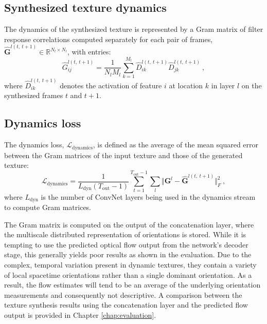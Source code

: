\subsection{Synthesized texture dynamics}

The dynamics of the synthesized texture is represented
by a Gram matrix of filter response correlations 
computed separately for each pair of frames,
$\hat{\mathbf{G}}^{l(t,\ t+1)} \in \mathbb{R}^{N_l \times N_l}$,
with entries:
\begin{equation}
	\hat{G}_{ij}^{l(t,\ t+1)} = \frac{1}{N_l M_l} \sum_{k=1}^{M_l} \hat{D}_{ik}^{l(t,\ t+1)} \hat{D}_{jk}^{l(t,\ t+1)}\ ,	
\end{equation}
where $\hat{D}_{ik}^{l(t,\ t+1)}$ denotes the activation of feature $i$ at
location $k$ in layer $l$ on the synthesized frames $t$ and $t+1$.

\subsection{Dynamics loss}

The dynamics loss, $\mathcal{L}_\text{dynamics}$, is defined as
the average of the mean squared error between the Gram matrices
of the input texture
and those of the generated texture:
\begin{equation}
   \mathcal{L}_\text{dynamics} = \frac{1}{L_\text{dyn} (T_\text{out}-1)}\sum_{t=1}^{T_\text{out}-1} \sum_{l}  \Vert \mathbf{G}^l - \hat{\mathbf{G}}^{l(t,\ t+1)}\Vert^2_F\ , \label{eq:dynloss}
\end{equation}
where $L_\text{dyn}$ is the number of ConvNet layers being used
in the dynamics stream to compute Gram matrices.

The Gram matrix is computed on the output of the concatenation layer,
where the multiscale distributed representation of orientations is
stored. While it is tempting to use the predicted optical flow output from the
network's decoder stage, this generally yields poor results as shown in the evaluation.
Due to the complex, temporal variation present in dynamic
textures, they contain a variety of local spacetime
orientations rather than a single dominant orientation.
As a result, the flow estimates will tend to be an average of the
underlying  orientation measurements and consequently not
descriptive. A comparison between the texture synthesis results using the concatenation layer and the predicted flow output is provided in Chapter \ref{chap:evaluation}.

